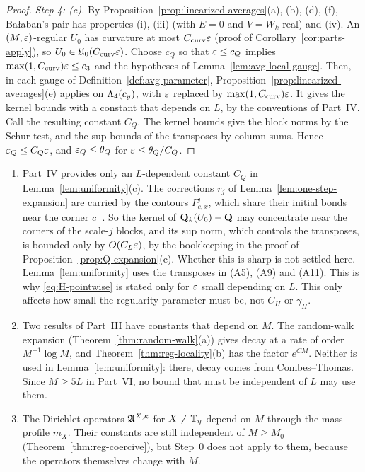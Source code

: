 \begin{proof}
\emph{Step 4: (c).} By Proposition~\ref{prop:linearized-averages}(a), (b), (d), (f), Ba\l aban's pair has properties (i), (iii) (with $E=0$ and $V=W_k$ real) and (iv). An $(M,\varepsilon)$-regular $U_0$ has curvature at most $C_{\rm curv}\varepsilon$ (proof of Corollary~\ref{cor:parts-apply}), so $U_0\in\mathfrak U_0(C_{\rm curv}\varepsilon)$. Choose $c_Q$ so that $\varepsilon\le c_Q$ implies $\max(1,C_{\rm curv})\varepsilon\le c_3$ and the hypotheses of Lemma~\ref{lem:avg-local-gauge}. Then, in each gauge of Definition~\ref{def:avg-parameter}, Proposition~\ref{prop:linearized-averages}(e) applies on $\Lambda_4(c_y)$, with $\varepsilon$ replaced by $\max(1,C_{\rm curv})\varepsilon$. It gives the kernel bounds with a constant that depends on $L$, by the conventions of Part~IV. Call the resulting constant $C_Q$. The kernel bounds give the block norms by the Schur test, and the sup bounds of the transposes by column sums. Hence $\varepsilon_Q\le C_Q\varepsilon$, and $\varepsilon_Q\le\theta_Q$ for $\varepsilon\le\theta_Q/C_Q$.
\end{proof}

\begin{remark}\label{rem:uniformity-limits}
\begin{enumerate}[label=(\alph*)]
\item Part~IV provides only an $L$-dependent constant $C_Q$ in Lemma~\ref{lem:uniformity}(c). The corrections $r_j$ of Lemma~\ref{lem:one-step-expansion} are carried by the contours $\Gamma^j_{c,x}$, which share their initial bonds near the corner $c_-$. So the kernel of $\mathbf Q_k(U_0)-\mathbf Q$ may concentrate near the corners of the scale-$j$ blocks, and its sup norm, which controls the transposes, is bounded only by $O(C_L\varepsilon)$, by the bookkeeping in the proof of Proposition~\ref{prop:Q-expansion}(c). Whether this is sharp is not settled here. Lemma~\ref{lem:uniformity} uses the transposes in (A5), (A9) and (A11). This is why \eqref{eq:H-pointwise} is stated only for $\varepsilon$ small depending on $L$. This only affects how small the regularity parameter must be, not $C_H$ or $\gamma_H$.
\item Two results of Part~III have constants that depend on $M$. The random-walk expansion (Theorem~\ref{thm:random-walk}(a)) gives decay at a rate of order $M^{-1}\log M$, and Theorem~\ref{thm:reg-locality}(b) has the factor $e^{CM}$. Neither is used in Lemma~\ref{lem:uniformity}: there, decay comes from Combes--Thomas. Since $M\ge5L$ in Part~VI, no bound that must be independent of $L$ may use them.
\item The Dirichlet operators $\mathfrak A^{X,\kappa}$ for $X\ne\mathbb T_\eta$ depend on $M$ through the mass profile $m_X$. Their constants are still independent of $M\ge M_0$ (Theorem~\ref{thm:reg-coercive}), but Step~0 does not apply to them, because the operators themselves change with $M$.
\end{enumerate}
\end{remark}

